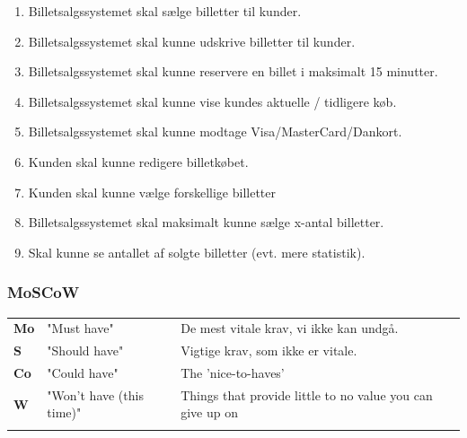 \begin{enumerate}
    \item Billetsalgssystemet skal sælge billetter til kunder.
    \item Billetsalgssystemet skal kunne udskrive billetter til kunder.
    \item Billetsalgssystemet skal kunne reservere en billet i maksimalt 15 minutter.
    \item Billetsalgssystemet skal kunne vise kundes aktuelle / tidligere køb.
    \item Billetsalgssystemet skal kunne modtage Visa/MasterCard/Dankort.
    \item Kunden skal kunne redigere billetkøbet.
    \item Kunden skal kunne vælge forskellige billetter
    \item Billetsalgssystemet skal maksimalt kunne sælge x-antal billetter.
    \item Skal kunne se antallet af solgte billetter (evt. mere statistik).
\end{enumerate}

\pagebreak

\subsubsection{MoSCoW}

\begin{tabular}{lll}
    \textbf{Mo} &   
    "Must have"                 &
    De mest vitale krav, vi ikke kan undgå. \\

    \textbf{S}  &   
    "Should have"               & 
    Vigtige krav, som ikke er vitale. \\

    \textbf{Co} &   
    "Could have"                & 
    The 'nice-to-haves' \\

    \textbf{W}  &   
    "Won’t have (this time)"    & 
    Things that provide little to no value you can give up on \\\\
\end{tabular}

